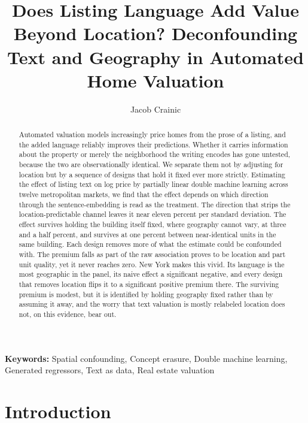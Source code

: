 \documentclass{article}
\title{Does Listing Language Add Value Beyond Location? Deconfounding Text and Geography in Automated Home Valuation}
\author{
    Jacob Crainic
}
\providecommand{\keywords}[1]{\noindent\textbf{Keywords:} #1\par}
\begin{document}
\maketitle

\begin{abstract}
Automated valuation models increasingly price homes from the prose of a listing, and
the added language reliably improves their predictions. Whether it carries
information about the property or merely the neighborhood the writing encodes has
gone untested, because the two are observationally identical. We separate them not by
adjusting for location but by a sequence of designs that hold it fixed ever more
strictly. Estimating the effect of listing text on log price by partially linear
double machine learning across twelve metropolitan markets, we find that the effect
depends on which direction through the sentence-embedding is read as the treatment.
The direction that strips the location-predictable channel leaves it near eleven
percent per standard deviation. The effect survives holding the
building itself fixed, where geography cannot vary, at three and a half percent, and
survives at one percent between near-identical units in the same building. Each
design removes more of what the estimate could be confounded with. The premium
falls as part of the raw association proves to be location and part unit quality, yet
it never reaches zero. New York makes this vivid. Its language is the most geographic
in the panel, its naive effect a significant negative, and every design that removes
location flips it to a significant positive premium there. The surviving premium is
modest, but it is identified by holding geography fixed rather than by assuming it
away, and the worry that text valuation is mostly relabeled location does not, on
this evidence, bear out.
\end{abstract}

\keywords{Spatial confounding, Concept erasure, Double machine learning, Generated regressors, Text as data, Real estate valuation}

\section{Introduction}
\end{document}
